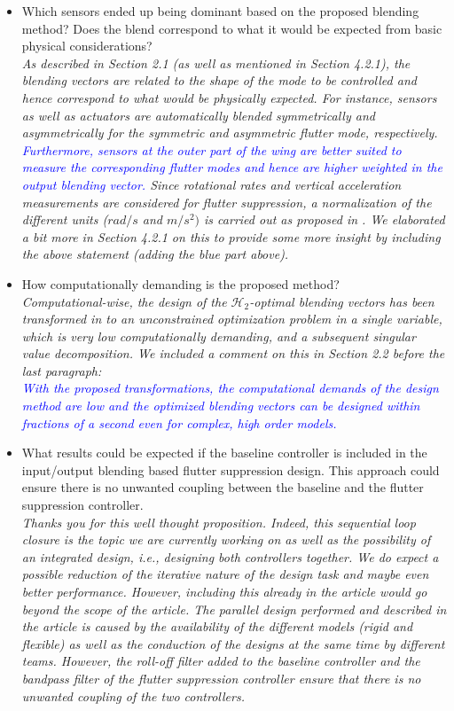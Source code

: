 \documentclass{article}
\begin{document}
\begin{itemize}
\item Which sensors ended up being dominant based on the proposed blending method? Does the blend correspond to what it would be expected from basic physical considerations?\\
\textit{As described in Section 2.1 (as well as mentioned in Section 4.2.1), the blending vectors are related to the shape of the mode to be controlled and hence correspond to what would be physically expected.  For instance, sensors as well as actuators are automatically blended symmetrically and asymmetrically for the symmetric and asymmetric flutter mode, respectively. \textit{\textcolor{blue}{ Furthermore, sensors at the outer part of the wing are better suited to measure the corresponding flutter modes and hence are higher weighted in the output blending vector. }} Since rotational rates and vertical acceleration measurements are considered for flutter suppression, a normalization of the different units ($rad/s$ and $m/s^2)$ is carried out as proposed in \cite{Pusch2018}. We elaborated a bit more in Section 4.2.1 on this to provide some more insight by including the above statement (adding the blue part above).}\\
		
		


\item How computationally demanding is the proposed method?\\
\textit{Computational-wise, the design of the $\mathcal{H}_2$-optimal blending vectors has been transformed in \cite{Pusch2018, Pusch18a} to an unconstrained optimization problem in a single variable, which is very low computationally demanding, and a subsequent singular value decomposition. We included a comment on this in Section 2.2 before the last paragraph:}\\
\textit{\textcolor{blue}{
With the proposed transformations, the  computational demands of the design method are low and the optimized blending vectors can be designed within fractions of a second even for complex, high order models.
}}

\item What results could be expected if the baseline controller is included in the input/output blending based flutter suppression design. This approach could ensure there is no unwanted coupling between the baseline and the flutter suppression controller.\\
\textit{Thanks you for this well thought proposition. Indeed, this sequential loop closure is the topic we are currently working on as well as the possibility of an integrated design, i.e., designing both controllers together.
We do expect a possible reduction of the iterative nature of the design task and maybe even better performance. However, including this already in the article would go beyond the scope of the article. The parallel design performed and described in the article is caused by the availability of the different models (rigid and flexible) as well as the conduction of the designs at the same time by different teams. However, the roll-off filter added to the baseline controller and the bandpass filter of the flutter suppression controller ensure that there is no unwanted coupling of the two controllers.} 


\end{itemize}
\end{document}
